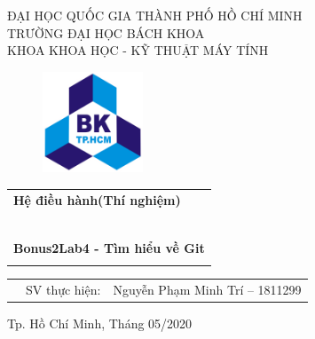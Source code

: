 \documentclass[a4paper]{article}
\begin{document}
	
	\begin{titlepage}
		\begin{center}
			ĐẠI HỌC QUỐC GIA THÀNH PHỐ HỒ CHÍ MINH \\
			TRƯỜNG ĐẠI HỌC BÁCH KHOA \\
			KHOA KHOA HỌC - KỸ THUẬT MÁY TÍNH 
		\end{center}
		
		\vspace{1cm}
		
		\begin{figure}[h!]
			\begin{center}
				\includegraphics[width=3cm]{Images/hcmut.png}
			\end{center}
		\end{figure}
		
		\vspace{1cm}
		
		
		\begin{center}
			\begin{tabular}{c}
				\multicolumn{1}{l}{\textbf{{\Large Hệ điều hành(Thí nghiệm)}}}\\
				~~\\
				\hline
				\\
				\textbf{{\Huge Bonus2Lab4 - Tìm hiểu về Git}}\\
				\\
				\hline
			\end{tabular}
		\end{center}
		
		\vspace{1.5cm}
		
		\begin{table}[h]
			\begin{tabular}{rrl}
				& SV thực hiện: & Nguyễn Phạm Minh Trí -- 1811299 \\
			\end{tabular}
		\end{table}
		\vspace{1.5cm}
		\begin{center}
			{\footnotesize Tp. Hồ Chí Minh, Tháng 05/2020}
		\end{center}
	\end{titlepage}
	
\end{document}
